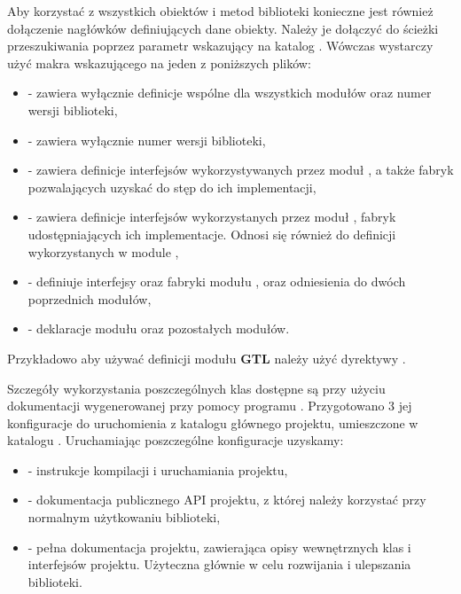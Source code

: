 \documentclass{standalone}
\begin{document}
Aby korzystać z wszystkich obiektów i metod biblioteki konieczne jest również dołączenie nagłówków definiujących
dane obiekty. Należy je dołączyć do ścieżki przeszukiwania poprzez parametr 
wskazujący na katalog . Wówczas wystarczy użyć makra  wskazującego na jeden z poniższych
plików:
\begin{itemize}
\item {} - zawiera wyłącznie definicje wspólne dla wszystkich modułów oraz numer wersji biblioteki,
\item {} - zawiera wyłącznie numer wersji biblioteki,
\item {} - zawiera definicje interfejsów wykorzystywanych przez moduł , a także 
fabryk pozwalających uzyskać do stęp do ich implementacji,
\item {} - zawiera definicje interfejsów wykorzystanych przez moduł , fabryk
udostępniających ich implementacje. Odnosi się również do definicji wykorzystanych w module ,
\item {} - definiuje interfejsy oraz fabryki modułu , oraz odniesienia do dwóch poprzednich
modułów,
\item {} - deklaracje modułu  oraz pozostałych modułów.
\end{itemize}

Przykładowo aby używać definicji modułu \textbf{GTL} należy użyć dyrektywy .

Szczegóły wykorzystania poszczególnych klas dostępne są przy użyciu dokumentacji wygenerowanej przy pomocy programu
. Przygotowano 3 jej konfiguracje do uruchomienia z katalogu głównego projektu, umieszczone w katalogu
. Uruchamiając poszczególne konfiguracje uzyskamy:
\begin{itemize}
\item {} - instrukcje kompilacji i uruchamiania projektu,
\item {} - dokumentacja publicznego API projektu, z której należy korzystać przy normalnym
użytkowaniu biblioteki,
\item {} - pełna dokumentacja projektu, zawierająca opisy wewnętrznych klas i interfejsów
projektu. Użyteczna głównie w celu rozwijania i ulepszania biblioteki.
\end{itemize}
\end{document}
